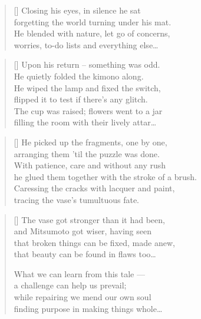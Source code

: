 \begin{multicols}{2}
	\begin{verse}[\versewidth]
		Closing his eyes, in silence he sat\\
		forgetting the world turning under his mat.\\
		He blended with nature, let go of concerns,\\
		worries, to-do lists and everything else\ldots
	\end{verse}
	
	\begin{verse}[\versewidth]
		Upon his return -- something was odd.\\
		He quietly folded the kimono along.\\
		He wiped the lamp and fixed the switch,\\
		flipped it to test if there's any glitch.\\
		The cup was raised; flowers went to a jar\\
		filling the room with their lively attar\ldots
	\end{verse}
	
	
	\begin{verse}[\versewidth]
		He picked up the fragments, one by one,\\
		arranging them 'til the puzzle was done.\\
		With patience, care and without any rush\\
		he glued them together with the stroke of a brush.\\
		
		Caressing the cracks with lacquer and paint,\\
		tracing the vase's tumultuous fate.

	\end{verse}
	
	
	\begin{verse}[\versewidth]
		The vase got stronger than it had been,\\
		and Mitsumoto got wiser, having seen\\
		that broken things can be fixed, made anew,\\
		that beauty can be found in flaws too\ldots
		
		What we can learn from this tale ---\\
		a challenge can help us prevail;\\
		while repairing we mend our own soul\\
		finding purpose in making things whole\ldots
	\end{verse}
	
	
\end{multicols}

